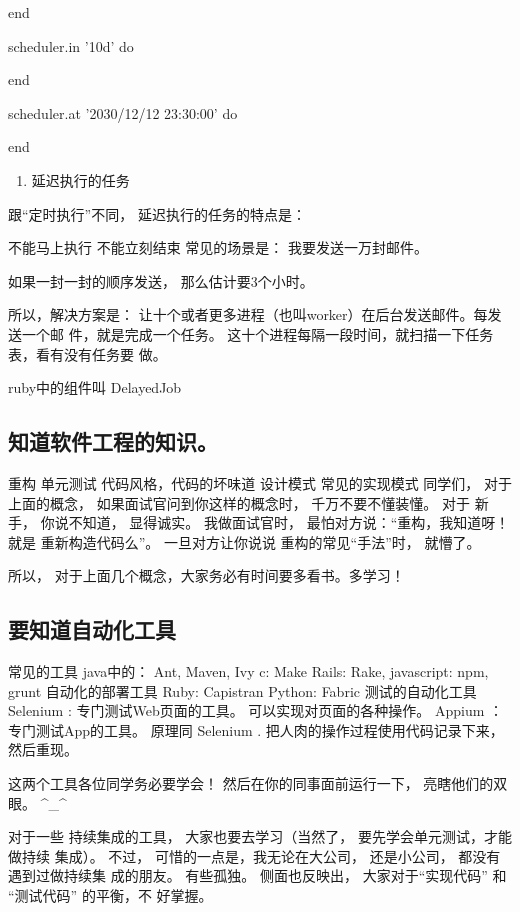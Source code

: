 \documentclass[11pt]{ctexart}
\begin{document}
{{{{end

scheduler.in '10d' do

end

scheduler.at '2030/12/12 23:30:00' do

end
\begin{enumerate}
\item 延迟执行的任务
\end{enumerate}

跟“定时执行”不同， 延迟执行的任务的特点是：

不能马上执行
不能立刻结束
常见的场景是： 我要发送一万封邮件。

如果一封一封的顺序发送， 那么估计要3个小时。

所以，解决方案是： 让十个或者更多进程（也叫worker）在后台发送邮件。每发送一个邮
件，就是完成一个任务。 这十个进程每隔一段时间，就扫描一下任务表，看有没有任务要
做。


ruby中的组件叫 DelayedJob

\subsection{知道软件工程的知识。}
\label{sec:org99be872}
重构
单元测试
代码风格，代码的坏味道
设计模式
常见的实现模式
同学们， 对于上面的概念， 如果面试官问到你这样的概念时， 千万不要不懂装懂。 对于
新手， 你说不知道， 显得诚实。 我做面试官时， 最怕对方说：“重构，我知道呀！ 就是
重新构造代码么”。 一旦对方让你说说 重构的常见“手法”时， 就懵了。


所以， 对于上面几个概念，大家务必有时间要多看书。多学习！

\subsection{要知道自动化工具}
\label{sec:orgbfecfce}
常见的工具
java中的： Ant, Maven, Ivy
c: Make
Rails: Rake,
javascript: npm, grunt
自动化的部署工具
Ruby: Capistran
Python: Fabric
测试的自动化工具
Selenium : 专门测试Web页面的工具。 可以实现对页面的各种操作。
Appium ： 专门测试App的工具。 原理同 Selenium . 把人肉的操作过程使用代码记录下来，
然后重现。

这两个工具各位同学务必要学会！ 然后在你的同事面前运行一下， 亮瞎他们的双眼。 \^{}\_\^{}

对于一些 持续集成的工具， 大家也要去学习（当然了， 要先学会单元测试，才能做持续
集成）。 不过， 可惜的一点是，我无论在大公司， 还是小公司， 都没有遇到过做持续集
成的朋友。 有些孤独。 侧面也反映出， 大家对于“实现代码” 和 “测试代码” 的平衡，不
好掌握。


}}}}
\end{document}
